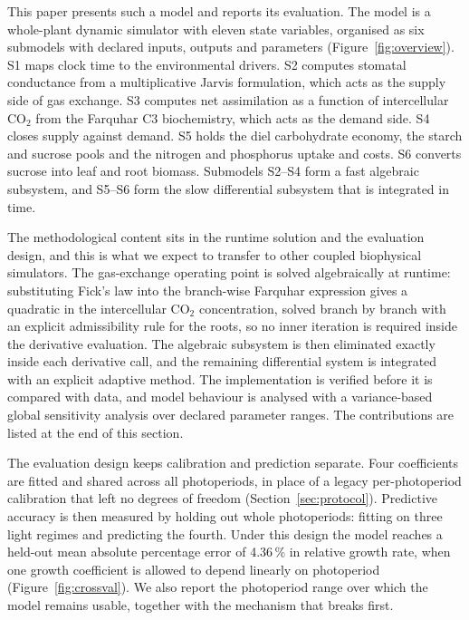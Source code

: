This paper presents such a model and reports its evaluation. The model is a
whole-plant dynamic simulator with eleven state variables, organised as six
submodels with declared inputs, outputs and parameters
(Figure~\ref{fig:overview}). S1 maps clock time to
the environmental drivers. S2 computes stomatal conductance from a
multiplicative Jarvis formulation, which acts as the supply side of gas
exchange. S3 computes net assimilation as a function of intercellular CO$_2$
from the Farquhar C3 biochemistry, which acts as the demand side. S4 closes
supply against demand. S5 holds the diel carbohydrate economy, the starch and
sucrose pools and the nitrogen and phosphorus uptake and costs. S6 converts
sucrose into leaf and root biomass. Submodels S2--S4 form a fast algebraic
subsystem, and S5--S6 form the slow differential subsystem that is integrated
in time.

The methodological content sits in the runtime solution and the evaluation
design, and this is what we expect to transfer to other coupled biophysical
simulators. The gas-exchange operating point is solved algebraically at runtime:
substituting Fick's law into the branch-wise Farquhar expression gives a
quadratic in the intercellular CO$_2$ concentration, solved branch by branch
with an explicit admissibility rule for the roots, so no inner iteration is
required inside the derivative evaluation. The algebraic subsystem is then
eliminated exactly inside each derivative call, and the remaining differential
system is integrated with an explicit adaptive method. The implementation is
verified before it is compared with data, and model behaviour is analysed with a
variance-based global sensitivity analysis over declared parameter ranges. The
contributions are listed at the end of this section.

The evaluation design keeps calibration and prediction separate. Four
coefficients are fitted and shared across all photoperiods, in place of a legacy
per-photoperiod calibration that left no degrees of freedom
(Section~\ref{sec:protocol}). Predictive accuracy is then measured by holding out
whole photoperiods: fitting on three light regimes and predicting the fourth.
Under this design the model reaches a held-out mean absolute percentage error of
4.36\,\% in relative growth rate, when one growth coefficient is allowed to
depend linearly on photoperiod (Figure~\ref{fig:crossval}). We also report the
photoperiod range over which the model remains usable, together with the
mechanism that breaks first.

